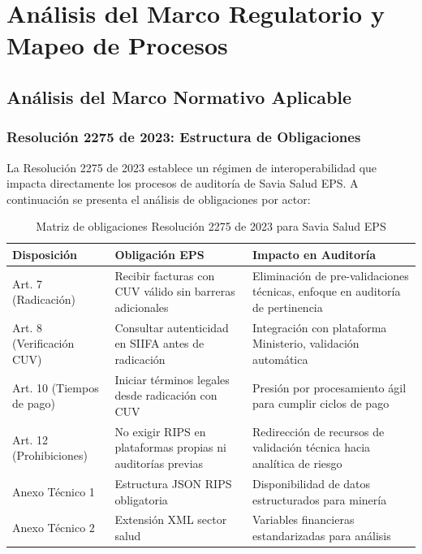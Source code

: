 \documentclass[12pt,letterpaper]{report}
\begin{document}
\chapter{Análisis del Marco Regulatorio y Mapeo de Procesos}

\section{Análisis del Marco Normativo Aplicable}

\subsection{Resolución 2275 de 2023: Estructura de Obligaciones}

La Resolución 2275 de 2023 establece un régimen de interoperabilidad que impacta directamente los procesos de auditoría de Savia Salud EPS. A continuación se presenta el análisis de obligaciones por actor:

\begin{table}[H]
\centering
\caption{Matriz de obligaciones Resolución 2275 de 2023 para Savia Salud EPS}
\label{tab:obligaciones}
\begin{tabular}{@{}p{4cm}p{5cm}p{5cm}@{}}
\toprule
\textbf{Disposición} & \textbf{Obligación EPS} & \textbf{Impacto en Auditoría} \\
\midrule
Art. 7 (Radicación) & Recibir facturas con CUV válido sin barreras adicionales & Eliminación de pre-validaciones técnicas, enfoque en auditoría de pertinencia \\
Art. 8 (Verificación CUV) & Consultar autenticidad en SIIFA antes de radicación & Integración con plataforma Ministerio, validación automática \\
Art. 10 (Tiempos de pago) & Iniciar términos legales desde radicación con CUV & Presión por procesamiento ágil para cumplir ciclos de pago \\
Art. 12 (Prohibiciones) & No exigir RIPS en plataformas propias ni auditorías previas & Redirección de recursos de validación técnica hacia analítica de riesgo \\
Anexo Técnico 1 & Estructura JSON RIPS obligatoria & Disponibilidad de datos estructurados para minería \\
Anexo Técnico 2 & Extensión XML sector salud & Variables financieras estandarizadas para análisis \\
\bottomrule
\end{tabular}
\end{table}
\end{document}
